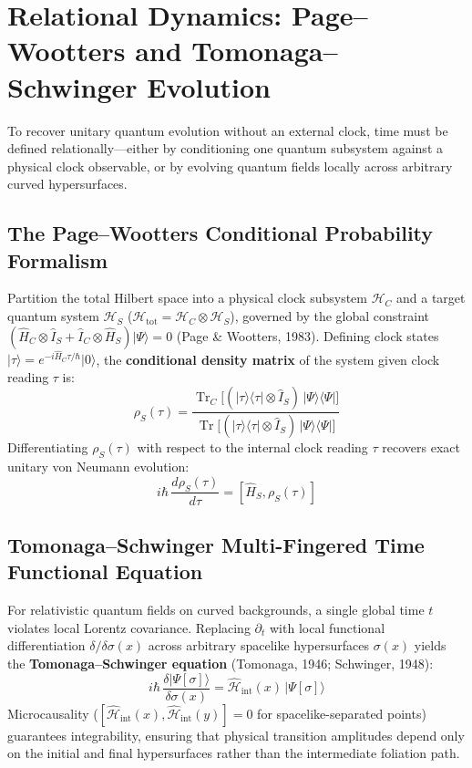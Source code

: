 \documentclass[11pt,a4paper]{article}
\begin{document}
\section{Relational Dynamics: Page--Wootters and Tomonaga--Schwinger Evolution}

To recover unitary quantum evolution without an external clock, time must be defined relationally---either by conditioning one quantum subsystem against a physical clock observable, or by evolving quantum fields locally across arbitrary curved hypersurfaces.

\subsection{The Page--Wootters Conditional Probability Formalism}

Partition the total Hilbert space into a physical clock subsystem $\mathcal{H}_C$ and a target quantum system $\mathcal{H}_S$ ($\mathcal{H}_{\text{tot}} = \mathcal{H}_C \otimes \mathcal{H}_S$), governed by the global constraint $(\hat{H}_C \otimes \hat{I}_S + \hat{I}_C \otimes \hat{H}_S)\vert\Psi\rangle = 0$ (Page \& Wootters, 1983). Defining clock states $\vert\tau\rangle = e^{-i\hat{H}_C \tau / \hbar}\vert 0\rangle$, the \textbf{conditional density matrix} of the system given clock reading $\tau$ is:
\begin{equation}
\rho_S(\tau) = \frac{\operatorname{Tr}_C\big[(\vert\tau\rangle\langle\tau\vert \otimes \hat{I}_S)\,\vert\Psi\rangle\langle\Psi\vert\big]}{\operatorname{Tr}\big[(\vert\tau\rangle\langle\tau\vert \otimes \hat{I}_S)\,\vert\Psi\rangle\langle\Psi\vert\big]}
\end{equation}
Differentiating $\rho_S(\tau)$ with respect to the internal clock reading $\tau$ recovers exact unitary von Neumann evolution:
\begin{equation}
i\hbar\,\frac{d\rho_S(\tau)}{d\tau} = [\hat{H}_S, \rho_S(\tau)]
\end{equation}

\subsection{Tomonaga--Schwinger Multi-Fingered Time Functional Equation}

For relativistic quantum fields on curved backgrounds, a single global time $t$ violates local Lorentz covariance. Replacing $\partial_t$ with local functional differentiation $\delta / \delta\sigma(x)$ across arbitrary spacelike hypersurfaces $\sigma(x)$ yields the \textbf{Tomonaga--Schwinger equation} (Tomonaga, 1946; Schwinger, 1948):
\begin{equation}
i\hbar\,\frac{\delta \vert\Psi[\sigma]\rangle}{\delta\sigma(x)} = \hat{\mathcal{H}}_{\text{int}}(x)\,\vert\Psi[\sigma]\rangle
\end{equation}
Microcausality ($[\hat{\mathcal{H}}_{\text{int}}(x), \hat{\mathcal{H}}_{\text{int}}(y)] = 0$ for spacelike-separated points) guarantees integrability, ensuring that physical transition amplitudes depend only on the initial and final hypersurfaces rather than the intermediate foliation path.
\end{document}
